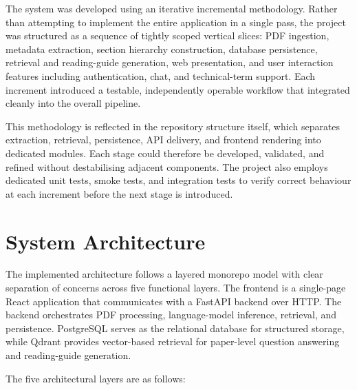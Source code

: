 \documentclass[12pt,a4paper]{report}
\begin{document}
The system was developed using an iterative incremental methodology. Rather
than attempting to implement the entire application in a single pass, the
project was structured as a sequence of tightly scoped vertical slices: PDF
ingestion, metadata extraction, section hierarchy construction, database
persistence, retrieval and reading-guide generation, web presentation, and user
interaction features including authentication, chat, and technical-term support.
Each increment introduced a testable, independently operable workflow that
integrated cleanly into the overall pipeline.

This methodology is reflected in the repository structure itself, which
separates extraction, retrieval, persistence, API delivery, and frontend
rendering into dedicated modules. Each stage could therefore be developed,
validated, and refined without destabilising adjacent components. The project
also employs dedicated unit tests, smoke tests, and integration tests to verify
correct behaviour at each increment before the next stage is introduced.

\section{System Architecture}

The implemented architecture follows a layered monorepo model with clear
separation of concerns across five functional layers. The frontend is a
single-page React application that communicates with a FastAPI backend over
HTTP. The backend orchestrates PDF processing, language-model inference,
retrieval, and persistence. PostgreSQL serves as the relational database for
structured storage, while Qdrant provides vector-based retrieval for
paper-level question answering and reading-guide generation.

The five architectural layers are as follows:
\end{document}

